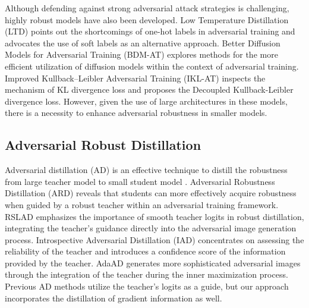 \documentclass{article} %
\begin{document}
Although defending against strong adversarial attack strategies\citep{AutoAttack, croce2020minimally,andriushchenko2020square} is challenging, highly robust models have also been developed.
Low Temperature Distillation (LTD) \citep{LTD} points out the shortcomings of one-hot labels in adversarial training and advocates the use of soft labels as an alternative approach.
Better Diffusion Models for Adversarial Training (BDM-AT) \citep{wang2023better} explores methods for the more efficient utilization of diffusion models within the context of adversarial training.
Improved Kullback–Leibler Adversarial Training (IKL-AT) \citep{cui2023decoupled} inspects the mechanism of KL divergence loss and proposes the Decoupled Kullback-Leibler divergence loss.
However, given the use of large architectures in these models, there is a necessity to enhance adversarial robustness in smaller models.

\subsection{Adversarial Robust Distillation}

Adversarial distillation (AD) is an effective technique to distill the robustness from large teacher model to small student model \citep{ard, iad, akd, rslad, adaad, jung2024peeraid, yin2024adversarial}.
Adversarial Robustness Distillation (ARD) \citep{ard} reveals that students can more effectively acquire robustness when guided by a robust teacher within an adversarial training framework. 
RSLAD \citep{rslad} emphasizes the importance of smooth teacher logits in robust distillation, integrating the teacher's guidance directly into the adversarial image generation process.
Introspective Adversarial Distillation (IAD) \citep{iad} concentrates on assessing the reliability of the teacher and introduces a confidence score of the information provided by the teacher.
AdaAD \citep{adaad} generates more sophisticated adversarial images through the integration of the teacher during the inner maximization process.
Previous AD methods utilize the teacher's logits as a guide, but our approach incorporates the distillation of gradient information as well.
\end{document}
